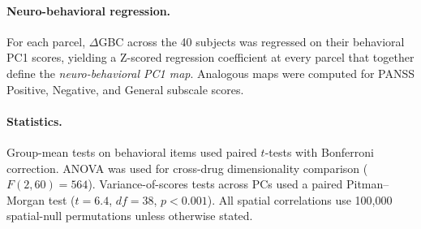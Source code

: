\documentclass[11pt]{article}
\begin{document}
\paragraph{Neuro-behavioral regression.} For each parcel, $\Delta$GBC
across the 40 subjects was regressed on their behavioral PC1 scores,
yielding a Z-scored regression coefficient at every parcel that together
define the \emph{neuro-behavioral PC1 map}. Analogous maps were computed
for PANSS Positive, Negative, and General subscale scores.

\paragraph{Statistics.} Group-mean tests on behavioral items used paired
$t$-tests with Bonferroni correction. ANOVA was used for cross-drug
dimensionality comparison ($F(2,60)=564$). Variance-of-scores tests across
PCs used a paired Pitman--Morgan test ($t=6.4$, $df=38$, $p<0.001$). All
spatial correlations use 100{,}000 spatial-null permutations unless
otherwise stated.



\end{document}
